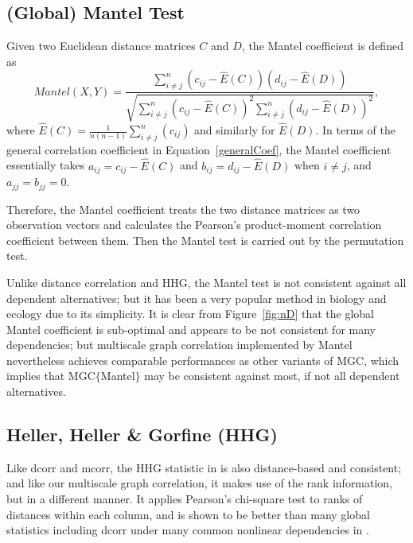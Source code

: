 \documentclass[11pt]{article}
\begin{document}
\subsection{(Global) Mantel Test}
\label{appen:mantel}
Given two Euclidean distance matrices $C$ and $D$, the Mantel coefficient \cite{Mantel1967} is defined as 
\begin{equation}
Mantel(X,Y)=\frac{\sum_{i \neq j}^{n}(c_{ij}-\hat{E}(C))(d_{ij}-\hat{E}(D))}{\sqrt{\sum_{i \neq j}^{n}(c_{ij}-\hat{E}(C))^2 \sum_{i \neq j}^{n}(d_{ij}-\hat{E}(D))^2}},
\end{equation}
where $\hat{E}(C)=\frac{1}{n(n-1)}\sum_{i \neq j}^{n}(c_{ij})$ and similarly for $\hat{E}(D)$. In terms of the general correlation coefficient in Equation~\ref{generalCoef}, the Mantel coefficient essentially takes $a_{ij}=c_{ij}-\hat{E}(C)$ and $b_{ij}=d_{ij}-\hat{E}(D)$ when $i \neq j$, and $a_{jj}=b_{jj}=0$.

Therefore, the Mantel coefficient treats the two distance matrices as two observation vectors and calculates the Pearson's product-moment correlation coefficient between them. Then the Mantel test is carried out by the permutation test.

Unlike distance correlation and HHG, the Mantel test is not consistent against all dependent alternatives; but it has been a very popular method in biology and ecology due to its simplicity. It is clear from Figure~\ref{fig:nD} that the global Mantel coefficient is sub-optimal and appears to be not consistent for many dependencies; but multiscale graph correlation implemented by Mantel nevertheless achieves comparable performances as other variants of MGC, which implies that MGC$\{$Mantel$\}$ may be consistent against most, if not all dependent alternatives.

\subsection{Heller, Heller \& Gorfine (HHG)}
\label{appen:hhg}
Like dcorr and mcorr, the HHG statistic in \cite{HellerGorfine2013} is also distance-based and consistent; and like our multiscale graph correlation, it makes use of the rank information, but in a different manner. It applies Pearson's chi-square test to ranks of distances within each column, and is shown to be better than many global statistics including dcorr under many common nonlinear dependencies in \cite{GorfineHellerHeller2012, HellerGorfine2013}. 
\end{document}
